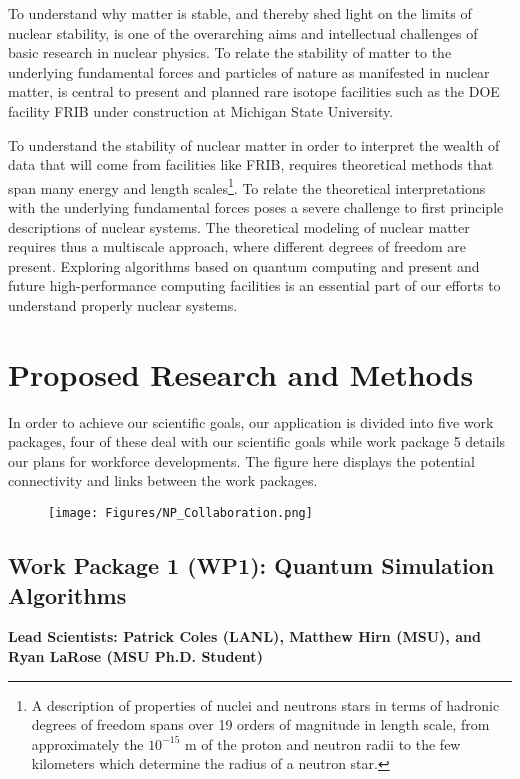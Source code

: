 \documentclass[10pt]{article}
\begin{document}
To understand why matter is stable, and thereby shed light on the
limits of nuclear stability, is one of the overarching aims and
intellectual challenges of basic research in nuclear physics. To
relate the stability of matter to the underlying fundamental forces
and particles of nature as manifested in nuclear matter, is central to
present and planned rare isotope facilities such as the DOE facility
FRIB under construction at Michigan State University.

To understand the stability of nuclear matter in order to interpret
the wealth of data that will come from facilities like FRIB, requires
theoretical methods that span many energy and length scales\footnote{A
  description of properties of nuclei and neutrons stars in terms of
  hadronic degrees of freedom spans over 19 orders of magnitude in
  length scale, from approximately the $10^{-15}$ m of the proton and
  neutron radii to the few kilometers which determine the radius of a
  neutron star.}. To relate the theoretical interpretations with the
underlying fundamental forces poses a severe challenge to first
principle descriptions of nuclear systems.  The theoretical modeling
of nuclear matter requires thus a multiscale approach, where different
degrees of freedom are present. Exploring algorithms based on quantum
computing and present and future high-performance computing facilities
is an essential part of our efforts to understand properly nuclear
systems.


\section{Proposed Research and Methods}

In order to achieve our scientific goals, our application is divided into five work packages, four of these deal with our scientific goals while work package 5 details our plans for workforce developments.  The figure here displays the potential connectivity and links between the work packages.
\begin{figure}[hbtp]
 \texttt{[image: Figures/NP\_Collaboration.png]}
\end{figure}


\subsection{Work Package 1 (WP1): Quantum Simulation Algorithms}

{\bf Lead Scientists: Patrick Coles (LANL), Matthew Hirn (MSU), and Ryan LaRose (MSU Ph.D. Student)}
\end{document}
